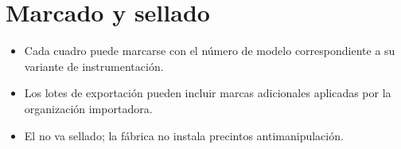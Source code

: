 \chapter{Marcado y sellado}\label{ch:marking}

\begin{itemize}
    \item Cada cuadro puede marcarse con el número de modelo correspondiente a su variante de instrumentación.
    \item Los lotes de exportación pueden incluir marcas adicionales aplicadas por la organización importadora.
    \item El \ReplicaGenOne{} no va sellado; la fábrica no instala precintos antimanipulación.
\end{itemize}
